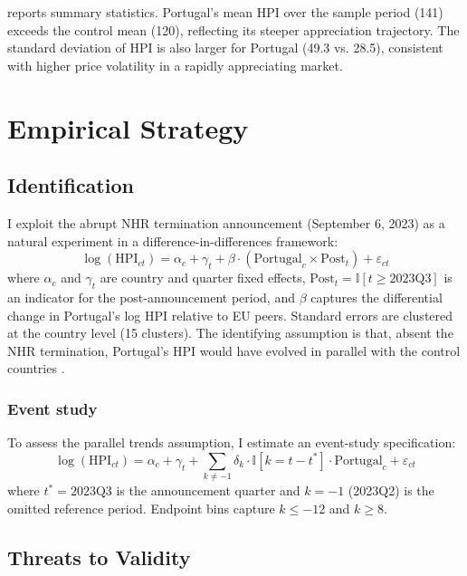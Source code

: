 \documentclass[12pt]{article}
\newcommand{\ind}{\mathbb{I}}
\begin{document}


 reports summary statistics. Portugal's mean HPI over the sample period (141) exceeds the control mean (120), reflecting its steeper appreciation trajectory. The standard deviation of HPI is also larger for Portugal (49.3 vs. 28.5), consistent with higher price volatility in a rapidly appreciating market.


\section{Empirical Strategy}

\subsection{Identification}

I exploit the abrupt NHR termination announcement (September 6, 2023) as a natural experiment in a difference-in-differences framework:
\begin{equation}
\label{eq:did}
\log(\text{HPI}_{ct}) = \alpha_c + \gamma_t + \beta \cdot (\text{Portugal}_c \times \text{Post}_t) + \varepsilon_{ct}
\end{equation}
where $\alpha_c$ and $\gamma_t$ are country and quarter fixed effects, $\text{Post}_t = \ind[t \geq 2023\text{Q3}]$ is an indicator for the post-announcement period, and $\beta$ captures the differential change in Portugal's log HPI relative to EU peers. Standard errors are clustered at the country level (15 clusters). The identifying assumption is that, absent the NHR termination, Portugal's HPI would have evolved in parallel with the control countries \citep{callaway2021did, roth2023pretest}.

\subsubsection*{Event study} To assess the parallel trends assumption, I estimate an event-study specification:
\begin{equation}
\label{eq:es}
\log(\text{HPI}_{ct}) = \alpha_c + \gamma_t + \sum_{k \neq -1} \delta_k \cdot \ind[k = t - t^*] \cdot \text{Portugal}_c + \varepsilon_{ct}
\end{equation}
where $t^* = 2023\text{Q3}$ is the announcement quarter and $k = -1$ (2023Q2) is the omitted reference period. Endpoint bins capture $k \leq -12$ and $k \geq 8$.

\subsection{Threats to Validity}
\end{document}

